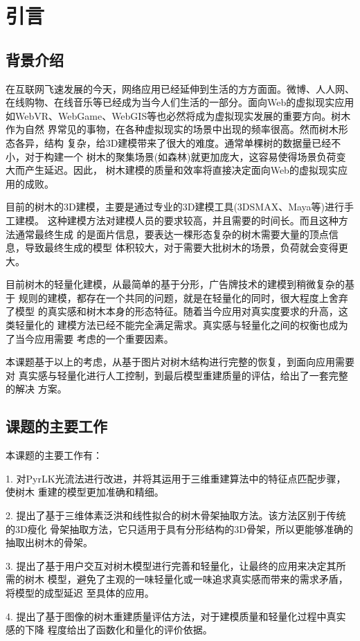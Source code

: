 



\chapter{引言}
\label{cha:intro}
\section{背景介绍}
\label{sec:background}
在互联网飞速发展的今天，网络应用已经延伸到生活的方方面面。微博、人人网、
在线购物、在线音乐等已经成为当今人们生活的一部分。面向Web的虚拟现实应用
如WebVR、WebGame、WebGIS等也必然将成为虚拟现实发展的重要方向。树木作为自然
界常见的事物，在各种虚拟现实的场景中出现的频率很高。然而树木形态各异，结构
复杂，给3D建模带来了很大的难度。通常单棵树的数据量已经不小，对于构建一个
树木的聚集场景(如森林)就更加庞大，这容易使得场景负荷变大而产生延迟。因此，
树木建模的质量和效率将直接决定面向Web的虚拟现实应用的成败。

目前的树木的3D建模，主要是通过专业的3D建模工具(3DSMAX、Maya等)进行手工建模。
这种建模方法对建模人员的要求较高，并且需要的时间长。而且这种方法通常最终生成
的是面片信息，要表达一棵形态复杂的树木需要大量的顶点信息，导致最终生成的模型
体积较大，对于需要大批树木的场景，负荷就会变得更大。

目前树木的轻量化建模，从最简单的基于分形，广告牌技术的建模到稍微复杂的基于
规则的建模，都存在一个共同的问题，就是在轻量化的同时，很大程度上舍弃了模型
的真实感和树木本身的形态特征。随着当今应用对真实度要求的升高，这类轻量化的
建模方法已经不能完全满足需求。真实感与轻量化之间的权衡也成为了当今应用需要
考虑的一个重要因素。

本课题基于以上的考虑，从基于图片对树木结构进行完整的恢复，到面向应用需要对
真实感与轻量化进行人工控制，到最后模型重建质量的评估，给出了一套完整的解决
方案。

\section{课题的主要工作}
\label{sec:objective}
本课题的主要工作有：

1. 对PyrLK光流法进行改进，并将其运用于三维重建算法中的特征点匹配步骤，使树木
重建的模型更加准确和精细。

2. 提出了基于三维体素泛洪和线性拟合的树木骨架抽取方法。该方法区别于传统的3D瘦化
骨架抽取方法，它只适用于具有分形结构的3D骨架，所以更能够准确的抽取出树木的骨架。

3. 提出了基于用户交互对树木模型进行完善和轻量化，让最终的应用来决定其所需的树木
模型，避免了主观的一味轻量化或一味追求真实感而带来的需求矛盾，将模型的成型延迟
至具体的应用。

4. 提出了基于图像的树木重建质量评估方法，对于建模质量和轻量化过程中真实感的下降
程度给出了函数化和量化的评价依据。
